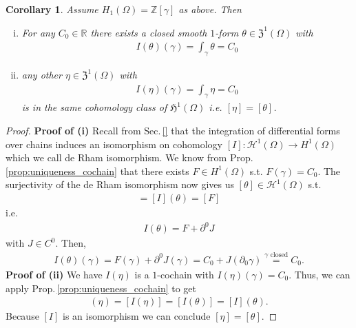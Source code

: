 \documentclass[12pt,a4paper]{article}
\numberwithin{equation}{subsection}
\numberwithin{lemma}{subsection}
\newtheorem{corollary}[lemma]{Corollary}
\theoremstyle{definition}
\newcommand{\integers}{\mathbb{Z}}
\newcommand{\real}{\mathbb{R}}
\begin{document}
\begin{corollary}
    Assume $H_1(\Omega) = \integers [\gamma]$ as above. Then
    \begin{enumerate}[(i)]
        \item For any $C_0 \in \real$ there exists a closed smooth $1$-form 
            $\theta \in \mathfrak{Z}^1(\Omega)$ with 
            \begin{align*}
                I(\theta)(\gamma) = \int_\gamma \theta = C_0
            \end{align*}
        \item any other $\eta \in \mathfrak{Z}^1(\Omega)$ with 
            \begin{align*}
                I(\eta)(\gamma) = \int_\gamma \eta = C_0
            \end{align*}
            is in the same cohomology class of $\mathfrak{H}^1(\Omega)$ 
            i.e. $[\eta] = [\theta]$.
    \end{enumerate}
\end{corollary}
\begin{proof}
    \textbf{Proof of (i)}
    Recall from Sec.\,\ref{} that the integration of differential forms 
    over chains induces an isomorphism on cohomology 
    $[I]: \mathscr{H}^1(\Omega) \rightarrow H^1(\Omega)$ which we call 
    de Rham isomorphism. We know from 
    Prop.\,\ref{prop:uniqueness_cochain} that there exists $F\in H^1(\Omega)$ 
    s.t. $F(\gamma) = C_0$. The surjectivity of the de Rham isomorphism 
    now gives us $[\theta] \in \mathscr{H}^1(\Omega)$ s.t.
    \begin{align*}
        [I(\theta)] = [I](\theta) = [F]
    \end{align*}
    i.e.
    \begin{align*}
        I(\theta) = F + \partial^0 J
    \end{align*}
    with $J \in C^0$. Then, 
    \begin{align*}
        I(\theta)(\gamma) = F(\gamma) + \partial^0 J(\gamma) 
        = C_0 + J(\partial_0 \gamma) 
        \stackrel{\text{$\gamma$ closed}}{=} C_0. 
    \end{align*}
    \textbf{Proof of (ii)}
    We have $I(\eta)$ is a $1$-cochain with $I(\eta)(\gamma) = C_0$.
    Thus, we can apply Prop.\,\ref{prop:uniqueness_cochain} to get
    \begin{align*}
        [I](\eta)=[I(\eta)] = [I(\theta)]=[I](\theta).
    \end{align*}
    Because $[I]$ is an isomorphism we can conclude $[\eta] = [\theta]$.
\end{proof}
\end{document}
